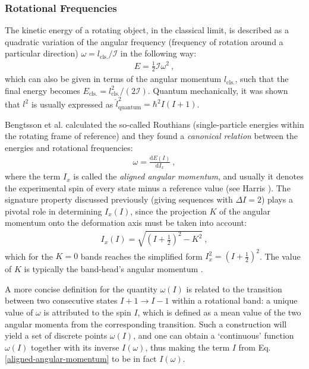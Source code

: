 \subsubsection*{Rotational Frequencies}

The kinetic energy of a rotating object, in the classical limit, is described as a quadratic variation of the angular frequency (frequency of rotation around a particular direction) $\omega=l_\text{cls.}/\mathcal{I}$ in the following way:
\begin{align}
    E=\frac{1}{2}\mathcal{I}\omega^2\ ,
\end{align}
which can also be given in terms of the angular momentum $l_\text{cls.}$, such that the final energy becomes $E_\text{cls.}=l_\text{cls.}^2/(2\mathcal{I})$. Quantum mechanically, it was shown that $l^2$ is usually expressed as $\hat{l}^2_\text{quantum}=\hbar^2 I(I+1)$.

Bengtsson et al. \cite{bengtsson1979quasiparticle} calculated the so-called Routhians (single-particle energies within the rotating frame of reference) and they found a \emph {canonical relation} between the energies and rotational frequencies:
\begin{align}
    \omega=\frac{\text{d}E(I)}{\text{d}I_x}\ ,
\end{align}
where the term $I_x$ is called the \emph{aligned angular momentum}, and usually it denotes the experimental spin of every state minus a reference value (see Harris \cite{harris1965higher}). The signature property discussed previously (giving sequences with $\Delta I=2$) plays a pivotal role in determining $I_x(I)$, since the projection $K$ of the angular momentum onto the deformation axis must be taken into account:
\begin{align}
    I_x(I)=\sqrt{\left(I+\frac{1}{2}\right)^2-K^2}\ ,
    \label{aligned-angular-momentum}
\end{align}
which for the $K=0$ bands reaches the simplified form $I_x^2=(I+\frac{1}{2})^2$. The value of $K$ is typically the band-head's angular momentum \cite{bengtsson1979quasiparticle,bengtsson1984signature}. 

A more concise definition for the quantity $\omega(I)$ is related to the transition between two consecutive states $I+1\to I-1$ within a rotational band: a unique value of $\omega$ is attributed to the spin $I$, which is defined as a mean value of the two angular momenta from the corresponding transition. Such a construction will yield a set of discrete points $\omega(I)$, and one can obtain a `continuous' function $\omega(I)$ together with its inverse $I(\omega)$, thus making the term $I$ from Eq. \ref{aligned-angular-momentum} to be in fact $I(\omega)$.

